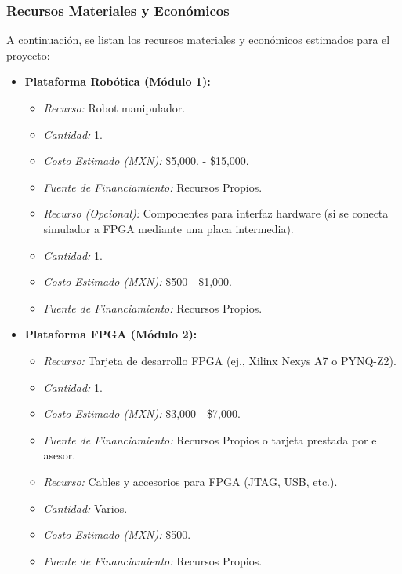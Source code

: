 \documentclass[12pt]{article}
\begin{document}
\subsubsection{Recursos Materiales y Económicos}
\label{sssec:recursos_materiales_economicos_listas}
A continuación, se listan los recursos materiales y económicos estimados para el proyecto:

\begin{itemize}
    \item \textbf{Plataforma Robótica (Módulo 1):}
        \begin{itemize}
            \item \textit{Recurso:} Robot manipulador.
            \item \textit{Cantidad:} 1.
            \item \textit{Costo Estimado (MXN):} \$5,000. - \$15,000.
            \item \textit{Fuente de Financiamiento:} Recursos Propios.
            \item \textit{Recurso (Opcional):} Componentes para interfaz hardware (si se conecta simulador a FPGA mediante una placa intermedia).
            \item \textit{Cantidad:} 1.
            \item \textit{Costo Estimado (MXN):} \$500 - \$1,000.
            \item \textit{Fuente de Financiamiento:} Recursos Propios.
        \end{itemize}
    \item \textbf{Plataforma FPGA (Módulo 2):}
        \begin{itemize}
            \item \textit{Recurso:} Tarjeta de desarrollo FPGA (ej., Xilinx Nexys A7 o PYNQ-Z2).
            \item \textit{Cantidad:} 1.
            \item \textit{Costo Estimado (MXN):} \$3,000 - \$7,000.
            \item \textit{Fuente de Financiamiento:} Recursos Propios o tarjeta prestada por el asesor.
            \item \textit{Recurso:} Cables y accesorios para FPGA (JTAG, USB, etc.).
            \item \textit{Cantidad:} Varios.
            \item \textit{Costo Estimado (MXN):} \$500.
            \item \textit{Fuente de Financiamiento:} Recursos Propios.
        \end{itemize}

\end{itemize}
\end{document}

